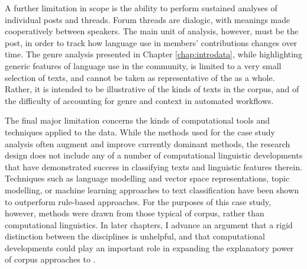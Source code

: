 A further limitation in scope is the ability to perform sustained analyses of individual \glspl{post} and \glspl{thread}. Forum \glspl{thread} are dialogic, with meanings made cooperatively between speakers. The main unit of analysis, however, must be the \gls{post}, in order to track how language use in members' contributions changes over time. The genre analysis presented in Chapter \ref{chap:introdata}, while highlighting generic features of language use in the community, is limited to a very small selection of texts, and cannot be taken as representative of the  as a whole. Rather, it is intended to be illustrative of the kinds of texts in the \gls{corpus}, and of the difficulty of accounting for genre and context in automated workflows.


The final major limitation concerns the kinds of computational tools and techniques applied to the data. While the methods used for the case study analysis often augment and improve currently dominant  methods, the research design does not include any of a number of computational linguistic developments that have demonstrated success in classifying texts and linguistic features therein. Techniques such as language modelling and vector space representations, topic modelling, or machine learning approaches to text classification have been shown to outperform rule-based approaches. For the purposes of this case study, however, methods were drawn from those typical of corpus, rather than computational linguistics. In later chapters, I advance an argument that a rigid distinction between the disciplines is unhelpful, and that computational developments could play an important role in expanding the explanatory power of corpus approaches to .




